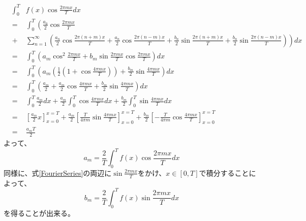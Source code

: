 \documentclass[a4paper]{jsarticle}
\begin{document}
\begin{eqnarray}
	&{\int _0 ^T}& f \left( x \right) \cos \frac { 2 \pi mx } { T } dx \nonumber \\
	&=& \int _0 ^T \left( \frac { a_0 } { 2 } \cos \frac { 2 \pi mx } { T } \right. \nonumber \\
	&+& \left. \sum _{ n = 1} ^\infty \left( \frac { a_n } { 2 } \cos \frac { 2 \pi \left( n + m \right) x } { T } + \frac { a_n } { 2 } \cos \frac { 2 \pi \left( n - m \right) x } { T } + \frac { b_n } { 2 } \sin \frac { 2 \pi \left( n + m \right) x } { T } + \frac { b_n } { 2 } \sin \frac { 2 \pi \left( n - m \right) x } { T } \right) \right) dx \nonumber \\
	&=& \int _0 ^T \left( a_m \cos ^2 \frac { 2 \pi mx } { T } + b_m \sin \frac { 2 \pi mx } { T } \cos \frac { 2 \pi mx } { T } \right) dx \nonumber \\
	&=& \int _0 ^T \left( a_m \left( \frac { 1 } { 2 } \left( 1 + \cos \frac { 4 \pi mx } { T } \right) \right) + \frac { b_m } { 2 } \sin \frac { 4 \pi mx } { T } \right) dx \nonumber \\
	&=& \int _0 ^T \left( \frac { a_m } { 2 } + \frac { a_m } { 2 } \cos \frac { 4 \pi mx } { T } + \frac { b_m } { 2 } \sin \frac { 4 \pi mx } { T } \right) dx \nonumber \\
	&=& \int _0 ^T \frac { a_m } { 2 } dx + \frac { a_m } { 2 } \int _0 ^T \cos \frac { 4 \pi mx } { T } dx + \frac { b_m } { 2 } \int _0 ^T \sin \frac { 4 \pi mx } { T } dx \nonumber \\
	&=& \left[ \frac { a_m } { 2 } x \right] _{ x = 0 } ^{ x = T } + \frac { a_m } { 2 } \left[ \frac { T } { 4 \pi m } \sin \frac { 4 \pi mx } { T } \right] _{ x = 0 } ^{ x = T } + \frac { b_m } { 2 } \left[ - \frac { T } { 4 \pi m } \cos \frac { 4 \pi mx } { T } \right] _{ x = 0 } ^{ x = T } \nonumber \\
	&=& \frac { a_mT } { 2 }
\end{eqnarray}
よって、
\begin{equation}
a_m = \frac { 2 } { T } \int _0 ^T f \left( x \right) \cos \frac { 2 \pi mx } { T } dx
\end{equation}
同様に、式\ref{FourierSeries}の両辺に$\sin \frac { 2 \pi mx } { T }$をかけ、$x \in \left[ 0,T \right]$で積分することによって、
\begin{equation}
b_m = \frac { 2 } { T } \int _0 ^T f \left( x \right) \sin \frac { 2 \pi mx } { T } dx
\end{equation}
を得ることが出来る。
\end{document}
